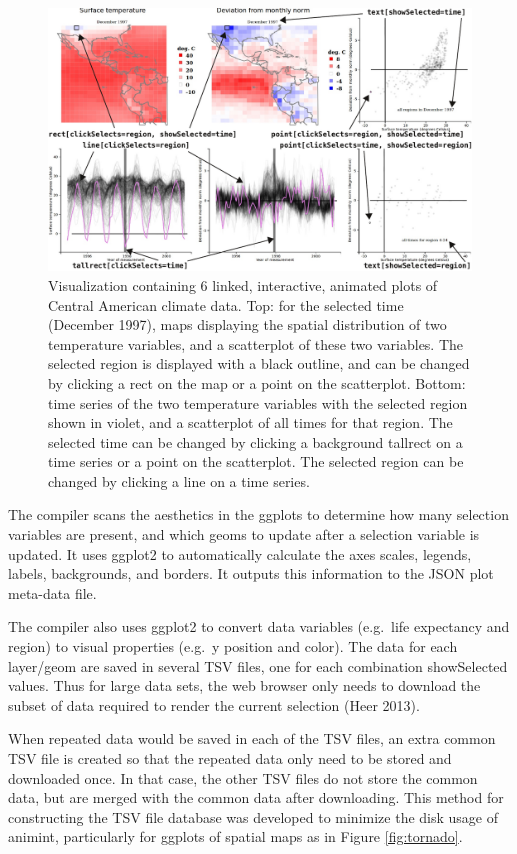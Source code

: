 \documentclass[12pt,]{article}
\theoremstyle{definition}
\theoremstyle{definition}
\theoremstyle{remark}
\begin{document}
\begin{figure}
\centering
\includegraphics{images/figure-climate.pdf}
\caption{\label{fig:climate}Visualization containing 6 linked, interactive,
animated plots of Central American climate data. Top: for the selected
time (December 1997), maps displaying the spatial distribution of two
temperature variables, and a scatterplot of these two variables. The
selected region is displayed with a black outline, and can be changed by
clicking a rect on the map or a point on the scatterplot. Bottom: time
series of the two temperature variables with the selected region shown
in violet, and a scatterplot of all times for that region. The selected
time can be changed by clicking a background tallrect on a time series
or a point on the scatterplot. The selected region can be changed by
clicking a line on a time series.}
\end{figure}

The compiler scans the aesthetics in the ggplots to determine how many
selection variables are present, and which geoms to update after a
selection variable is updated. It uses ggplot2 to automatically
calculate the axes scales, legends, labels, backgrounds, and borders. It
outputs this information to the JSON plot meta-data file.

The compiler also uses ggplot2 to convert data variables (e.g.~life
expectancy and region) to visual properties (e.g.~y position and color).
The data for each layer/geom are saved in several TSV files, one for
each combination showSelected values. Thus for large data sets, the web
browser only needs to download the subset of data required to render the
current selection (Heer 2013).

When repeated data would be saved in each of the TSV files, an extra
common TSV file is created so that the repeated data only need to be
stored and downloaded once. In that case, the other TSV files do not
store the common data, but are merged with the common data after
downloading. This method for constructing the TSV file database was
developed to minimize the disk usage of animint, particularly for
ggplots of spatial maps as in Figure \ref{fig:tornado}.
\end{document}
